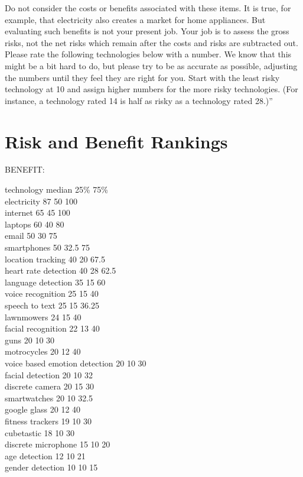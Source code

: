 \documentclass{acm_proc_article-sp}
\begin{document}
Do not consider the costs or benefits associated with these items. It is true, for example, that electricity also creates a market for home appliances. But evaluating such benefits is not your present job. Your job is to assess the gross risks, not the net risks which remain after the costs and risks are subtracted out.\\[-.6cm]

Please rate the following technologies below with a number. We know that this might be a bit hard to do, but please try to be as accurate as possible, adjusting the numbers until they feel they are right for you. Start with the least risky technology at 10 and assign higher numbers for the more risky technologies. (For instance, a technology rated 14 is half as risky as a technology rated 28.)''

\section{Risk and Benefit Rankings}
\label{sec:techrank}

BENEFIT: 

technology 	median	25\%		75\% \\
electricity	87	50	100\\
internet	65	45	100\\
laptops	60	40	80\\
email	50	30	75\\
smartphones	50	32.5	75\\
location tracking	40	20	67.5\\
heart rate detection	40	28	62.5\\
language detection	35	15	60\\
voice recognition	25	15	40\\
speech to text	25	15	36.25\\
lawnmowers	24	15	40\\
facial recognition	22	13	40\\
guns	20	10	30\\
motrocycles	20	12	40\\
voice based emotion detection	20	10	30\\
facial detection	20	10	32\\
discrete camera	20	15	30\\
smartwatches	20	10	32.5\\
google glass	20	12	40\\
fitness trackers	19	10	30\\
cubetastic	18	10	30\\
discrete microphone	15	10	20\\
age detection	12	10	21\\
gender detection	10	10	15
\end{document}
